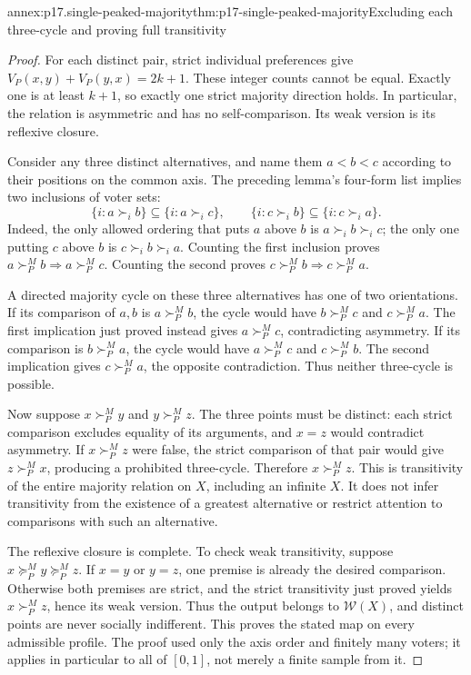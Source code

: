 \begin{annexitem}{annex:p17.single-peaked-majority}{thm:p17-single-peaked-majority}{Excluding each three-cycle and proving full transitivity}
\begin{proof}
For each distinct pair, strict individual preferences give
\(V_P(x,y)+V_P(y,x)=2k+1\). These integer counts cannot be equal.
Exactly one is at least \(k+1\), so exactly one strict majority
direction holds. In particular, the relation is asymmetric and has
no self-comparison. Its weak version is its reflexive closure.

Consider any three distinct alternatives, and name them \(a<b<c\)
according to their positions on the common axis. The preceding lemma's
four-form list implies two inclusions of voter sets:
\[
 \{i:a\succ_i b\}\subseteq\{i:a\succ_i c\},\qquad
 \{i:c\succ_i b\}\subseteq\{i:c\succ_i a\}.
\]
Indeed, the only allowed ordering that puts \(a\) above \(b\)
is \(a\succ_i b\succ_i c\); the only one putting \(c\) above
\(b\) is \(c\succ_i b\succ_i a\).
Counting the first inclusion proves
\(a\succ^M_P b\Rightarrow a\succ^M_P c\).
Counting the second proves
\(c\succ^M_P b\Rightarrow c\succ^M_P a\).

A directed majority cycle on these three alternatives has one of two
orientations. If its comparison of \(a,b\) is \(a\succ^M_P b\),
the cycle would have \(b\succ^M_P c\) and \(c\succ^M_P a\).
The first implication just proved instead gives \(a\succ^M_P c\),
contradicting asymmetry. If its comparison is \(b\succ^M_P a\),
the cycle would have \(a\succ^M_P c\) and \(c\succ^M_P b\).
The second implication gives \(c\succ^M_P a\), the opposite
contradiction. Thus neither three-cycle is possible.

Now suppose \(x\succ^M_P y\) and \(y\succ^M_P z\).
The three points must be distinct: each strict comparison excludes
equality of its arguments, and \(x=z\) would contradict asymmetry.
If \(x\succ^M_P z\) were false, the strict comparison of that
pair would give \(z\succ^M_P x\), producing a prohibited
three-cycle. Therefore \(x\succ^M_P z\). This is transitivity
of the entire majority relation on \(X\), including an infinite \(X\).
It does not infer transitivity from the existence of a greatest
alternative or restrict attention to comparisons with such an alternative.

The reflexive closure is complete. To check weak transitivity, suppose
\(x\succeq^M_P y\succeq^M_P z\). If \(x=y\) or \(y=z\),
one premise is already the desired comparison. Otherwise both premises
are strict, and the strict transitivity just proved yields
\(x\succ^M_P z\), hence its weak version. Thus the output belongs
to \(\mathcal W(X)\), and distinct points are never socially
indifferent. This proves the stated map on every admissible profile.
The proof used only the axis order and finitely many voters; it applies
in particular to all of \([0,1]\), not merely a finite sample from it.
\end{proof}
\end{annexitem}

